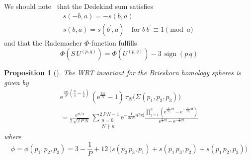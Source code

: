 \documentclass[12pt,reqno]{amsart}
\numberwithin{equation}{section}
\newtheorem{prop}[theorem]{Proposition}
\DeclareMathOperator{\sign}{sign}
\begin{document}
We should note~\cite{RademGross72} that the Dedekind sum satisfies
\begin{gather}
  s(-b, a )= - s (b,a)
  \\[2mm]
%
  s(b,a) = s(b^\prime, a) \quad
  \text{for $b \, b^\prime \equiv 1 \pmod{a}$
  }
\end{gather}
and that the Rademacher $\Phi$-function fulfills
\begin{equation}
  \Phi
  (S \,  U^{(p, q)})
  =
  \Phi
  (  U^{(p, q)})
  - 3 \, \sign(p \, q)
\end{equation}

\begin{prop}[\cite{LawreRozan99a}]
  The WRT invariant for the Brieskorn homology spheres is given by
  \begin{multline}
    \label{Rozansky}
    \mathrm{e}^{
      \frac{2 \pi \mathrm{i}}{N}
      ( \frac{\phi}{4} - \frac{1}{2} )
    } \,
    \left(
      \mathrm{e}^{\frac{2 \pi \mathrm{i}}{N}} - 1
    \right)
    \,    \tau_N \bigl( \Sigma(p_1,p_2,p_3) \bigr)
    \\
    =
    \frac{\mathrm{e}^{\pi \mathrm{i}/4}}{2 \, \sqrt{2 \, P \, N}}
    \,
    \sum_{\substack{
        n= 0 \\
        N \, \nmid \, n
    }}^{2 \, P \, N-1 }
    \mathrm{e}^{- \frac{1}{2 P N} n^2 \pi \mathrm{i} }
    \frac{
      \prod_{j=1}^3
      \left(
        \mathrm{e}^{\frac{  n}{N p_j} \pi \mathrm{i}}
        -
        \mathrm{e}^{- \frac{ n}{N p_j} \pi \mathrm{i} }
      \right)
    }{
      \mathrm{e}^{\frac{n}{N} \pi \mathrm{i}}
      -
      \mathrm{e}^{ - \frac{ n}{N} \pi \mathrm{i}}
    }
  \end{multline}
  where
  \begin{equation}
    \label{phi_definition}
    \phi
    =
    \phi(p_1, p_2, p_3)
    =
    3 - \frac{1}{P}
    +
    12 \, \bigl(
    s(p_2 \, p_3 , p_1) +
    s(p_1 \, p_3 , p_2) +
    s(p_1 \, p_2 , p_3) 
    \bigr)
  \end{equation}
\end{prop}
\end{document}
